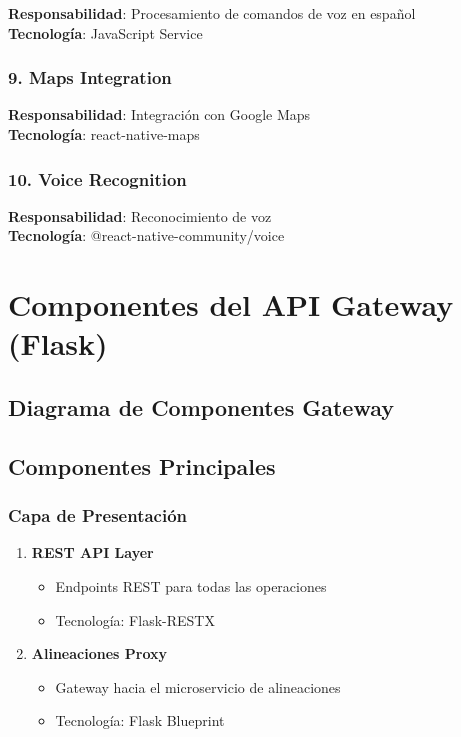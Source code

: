 \documentclass[
  spanish,
  11pt,
  letterpaper,
]{book}
\providecommand{\tightlist}{%
  \setlength{\itemsep}{0pt}\setlength{\parskip}{0pt}}
\begin{document}
\textbf{Responsabilidad}: Procesamiento de comandos de voz en español\\
\textbf{Tecnología}: JavaScript Service

\subsubsection{9. Maps Integration}\label{maps-integration}

\textbf{Responsabilidad}: Integración con Google Maps\\
\textbf{Tecnología}: react-native-maps

\subsubsection{10. Voice Recognition}\label{voice-recognition}

\textbf{Responsabilidad}: Reconocimiento de voz\\
\textbf{Tecnología}: @react-native-community/voice

\section{Componentes del API Gateway
(Flask)}\label{componentes-del-api-gateway-flask}

\subsection{Diagrama de Componentes
Gateway}\label{diagrama-de-componentes-gateway}

\subsection{Componentes Principales}\label{componentes-principales-2}

\subsubsection{Capa de Presentación}\label{capa-de-presentaciuxf3n}

\begin{enumerate}
\def\labelenumi{\arabic{enumi}.}
\tightlist
\item
  \textbf{REST API Layer}

  \begin{itemize}
  \tightlist
  \item
    Endpoints REST para todas las operaciones
  \item
    Tecnología: Flask-RESTX
  \end{itemize}
\item
  \textbf{Alineaciones Proxy}

  \begin{itemize}
  \tightlist
  \item
    Gateway hacia el microservicio de alineaciones
  \item
    Tecnología: Flask Blueprint
  \end{itemize}
\end{enumerate}
\end{document}
